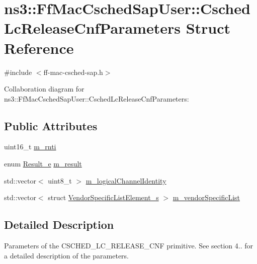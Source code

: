\hypertarget{structns3_1_1FfMacCschedSapUser_1_1CschedLcReleaseCnfParameters}{}\section{ns3\+:\+:Ff\+Mac\+Csched\+Sap\+User\+:\+:Csched\+Lc\+Release\+Cnf\+Parameters Struct Reference}
\label{structns3_1_1FfMacCschedSapUser_1_1CschedLcReleaseCnfParameters}


{\ttfamily \#include $<$ff-\/mac-\/csched-\/sap.\+h$>$}



Collaboration diagram for ns3\+:\+:Ff\+Mac\+Csched\+Sap\+User\+:\+:Csched\+Lc\+Release\+Cnf\+Parameters\+:
\subsection*{Public Attributes}
\begin{DoxyCompactItemize}
\item 
uint16\+\_\+t \hyperlink{structns3_1_1FfMacCschedSapUser_1_1CschedLcReleaseCnfParameters_a2148d9d37bfe7e72f061b69f5b9aaf2b}{m\+\_\+rnti}
\item 
enum \hyperlink{namespacens3_a7acf2b7f9e0781dfe43a6bc54d6ecd07}{Result\+\_\+e} \hyperlink{structns3_1_1FfMacCschedSapUser_1_1CschedLcReleaseCnfParameters_ada5fd70da09180897fbd6b73e2e9cd06}{m\+\_\+result}
\item 
std\+::vector$<$ uint8\+\_\+t $>$ \hyperlink{structns3_1_1FfMacCschedSapUser_1_1CschedLcReleaseCnfParameters_ae7887414b998fc63ac79c612ead21977}{m\+\_\+logical\+Channel\+Identity}
\item 
std\+::vector$<$ struct \hyperlink{structns3_1_1VendorSpecificListElement__s}{Vendor\+Specific\+List\+Element\+\_\+s} $>$ \hyperlink{structns3_1_1FfMacCschedSapUser_1_1CschedLcReleaseCnfParameters_ad8af73663bf2402110dc943df1a40aa8}{m\+\_\+vendor\+Specific\+List}
\end{DoxyCompactItemize}


\subsection{Detailed Description}
Parameters of the C\+S\+C\+H\+E\+D\+\_\+\+L\+C\+\_\+\+R\+E\+L\+E\+A\+S\+E\+\_\+\+C\+NF primitive. See section 4.. for a detailed description of the parameters. 

